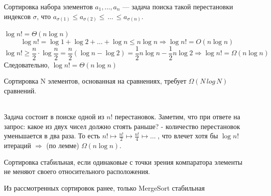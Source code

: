 \Def Сортировка набора элементов $a_1, \dots , a_n$ — задача поиска такой
перестановки индексов $\sigma$, что {\large $a_{\sigma(1)} \leq a_{\sigma(2)} \leq \, \dots \, \leq a_{\sigma(n)}$}.

\Lemma $\log{n!}=\Theta(n\log{n})$\\
\Proof
$$\log{n!}=\log{1}+\log{2}+\ldots+\log{n} \leq n\log{n} \Rightarrow \log{n!}=O(n\log{n})$$
$$\log{n!} \geq \frac{n}{2}\cdot \log{\frac{n}{2}} = \frac{n}{2}(\log{n} - \log{2}) = \frac{1}{2}n\log{n} - \frac{1}{2}n\log{2} \Rightarrow \log{n!}=\Omega(n\log{n})$$
Следовательно, $\log{n!}=\Theta(n\log{n})$ \Endproof

\Th Сортировка N элементов, основанная на сравнениях, требует $\Omega(N\,log\,N)$ сравнений.

\Proof \\ Задача состоит в поиске одной из $n!$ перестановок. Заметим, что при ответе на запрос: какое из двух чисел должно стоять раньше? - количество перестановок уменьшается в два раза. То есть $n! \mapsto \frac{n!}{2} \mapsto \frac{n!}{4} \mapsto \ldots \;$, что влечет хотя бы $\log{n!}$ итераций $\Rightarrow$ (по лемме) $\Omega(n\log{n})$. \Endproof

\Def Сортировка стабильная, если одинаковые с точки зрения компаратора элементы не меняют своего относительного расположения.

Из рассмотренных сортировок ранее, только MergeSort стабильная

\pagebreak
